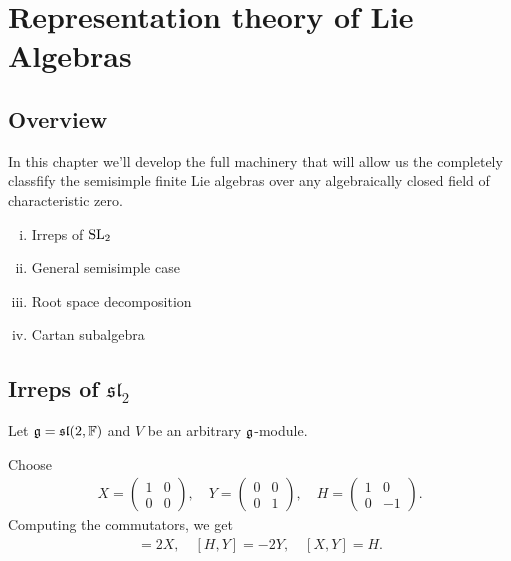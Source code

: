 \chapter{Representation theory of Lie Algebras}
\label{cha:representation_theory_of_lie_algebras}



\section{Overview}
In this chapter we'll develop the full machinery that will allow us the completely classfify the semisimple finite Lie algebras over any algebraically closed field of characteristic zero.

\begin{enumerate}[(i)]
    \makethislistcompact
    \item Irreps of $\text{SL}_2$
    \item General semisimple case
    \item Root space decomposition
    \item Cartan subalgebra
\end{enumerate}


\section{Irreps of \texorpdfstring{$\mathfrak{sl}_2$}{sl\_2}}
\label{sec:irreps_of_sl_2}

Let $\mathfrak{g}=\mathfrak{sl}(2,\mathbb{F})$ and $V$ be an arbitrary $\mathfrak{g}$-module.

Choose
\begin{align}
    X = \begin{pmatrix} 1 & 0 \\ 0 & 0 \end{pmatrix}, \quad
    Y = \begin{pmatrix} 0 & 0 \\ 0 & 1 \end{pmatrix}, \quad
    H = \begin{pmatrix} 1 & 0 \\ 0 & -1 \end{pmatrix}.
\end{align}
Computing the commutators, we get
\begin{align}
    [H,X] = 2X,\quad [H,Y]=-2Y,\quad [X,Y]=H.
\end{align}

